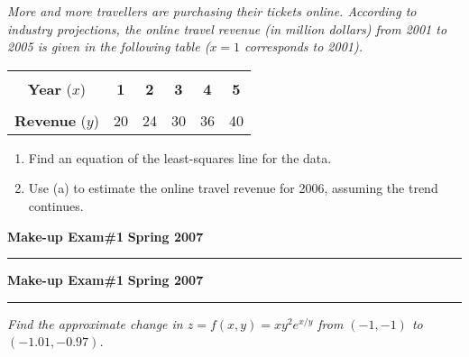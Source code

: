 \documentclass[12pt]{article}
\begin{document}
\bigskip
{\problem[16 pts] \em More and more travellers are purchasing their
  tickets online. According to industry projections, the online travel
revenue (in million dollars) from 2001 to 2005 is given in the
following table ($x=1$ corresponds to 2001).}
\begin{center}
  \begin{tabular}{|c|c|c|c|c|c|}
    \hline &&&&&\\
    {\bf Year} ($x$) & {\bf 1} & {\bf 2} & {\bf 3} & {\bf 4} & {\bf 5} \\
    \hline &&&&&\\
    {\bf Revenue} ($y$) & 20 & 24 & 30 & 36 & 40\\
    \hline
  \end{tabular}
\end{center}
\begin{enumerate}
\item Find an equation of the least-squares line for the data.
  \vspace{5cm}
  \begin{flushright}
    \framebox[10cm]{\raisebox{1cm}[2.6cm][0.4cm]}
  \end{flushright}
\item Use (a) to estimate the online travel revenue for 2006, assuming
  the trend continues.
  \vspace{5cm}
  \begin{flushright}
    \framebox[10cm]{\raisebox{1cm}[2.6cm][0.4cm]}
  \end{flushright}
\end{enumerate}

\hfill{\large\bf Make-up Exam\#1}\hfill{\large\bf
  Spring 2007}\hrule

\vspace{17cm}
  \begin{flushright}
    \framebox[10cm]{\raisebox{1cm}[2.6cm][0.4cm]}
  \end{flushright}
\newpage

\hfill{\large\bf Make-up Exam\#1}\hfill{\large\bf
  Spring 2007}\hrule

\bigskip
{\problem[14 pts] \em Find the approximate change in $z = f(x,y) =
  xy^2 e^{x/y}$ from $(-1,-1)$ to $(-1.01, -0.97)$.}
\vspace{18cm}
  \begin{flushright}
    \framebox[10cm]{\raisebox{1cm}[2.6cm][0.4cm]}
  \end{flushright}
\end{document}
